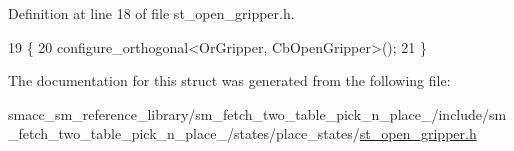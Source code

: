 Definition at line 18 of file st\+\_\+open\+\_\+gripper.\+h.


\begin{DoxyCode}
19     \{
20         configure\_orthogonal<OrGripper, CbOpenGripper>();
21     \}
\end{DoxyCode}


The documentation for this struct was generated from the following file\+:\begin{DoxyCompactItemize}
\item 
smacc\+\_\+sm\+\_\+reference\+\_\+library/sm\+\_\+fetch\+\_\+two\+\_\+table\+\_\+pick\+\_\+n\+\_\+place\+\_/include/sm\+\_\+fetch\+\_\+two\+\_\+table\+\_\+pick\+\_\+n\+\_\+place\+\_/states/place\+\_\+states/\hyperlink{sm__fetch__two__table__pick__n__place__1_2include_2sm__fetch__two__table__pick__n__place__1_2sta988ce571eabef88c0fcb2433d13039e3}{st\+\_\+open\+\_\+gripper.\+h}\end{DoxyCompactItemize}
